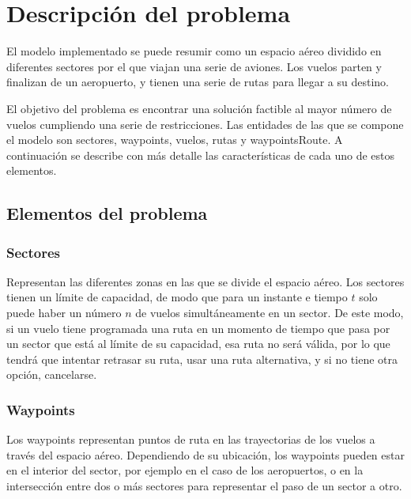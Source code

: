 \chapter{Descripción del problema}
\label{descripción}
El modelo implementado se puede resumir como un espacio aéreo dividido en diferentes sectores por el que viajan una serie de aviones. Los vuelos parten y finalizan de un aeropuerto, y tienen una serie de rutas para llegar a su destino.

El objetivo del problema es encontrar una solución factible al mayor número de vuelos cumpliendo una serie de restricciones. Las entidades de las que se compone el modelo son sectores, waypoints, vuelos, rutas y waypointsRoute. A continuación se describe con más detalle las características de cada uno de estos elementos.

\section{Elementos del problema}

\subsection*{Sectores}
Representan las diferentes zonas en las que se divide el espacio aéreo. Los sectores tienen un límite de capacidad, de modo que para un instante e tiempo $t$ solo puede haber un número $n$ de vuelos simultáneamente en un sector. De este modo, si un vuelo tiene programada una ruta en un momento de tiempo que pasa por un sector que está al límite de su capacidad, esa ruta no será válida, por lo que tendrá que intentar retrasar su ruta, usar una ruta alternativa, y si no tiene otra opción, cancelarse.

\subsection*{Waypoints}
Los waypoints representan puntos de ruta en las trayectorias de los vuelos a través del espacio aéreo. Dependiendo de su ubicación, los waypoints pueden estar en el interior del sector, por ejemplo en el caso de los aeropuertos, o en la intersección entre dos o más sectores para representar el paso de un sector a otro.


